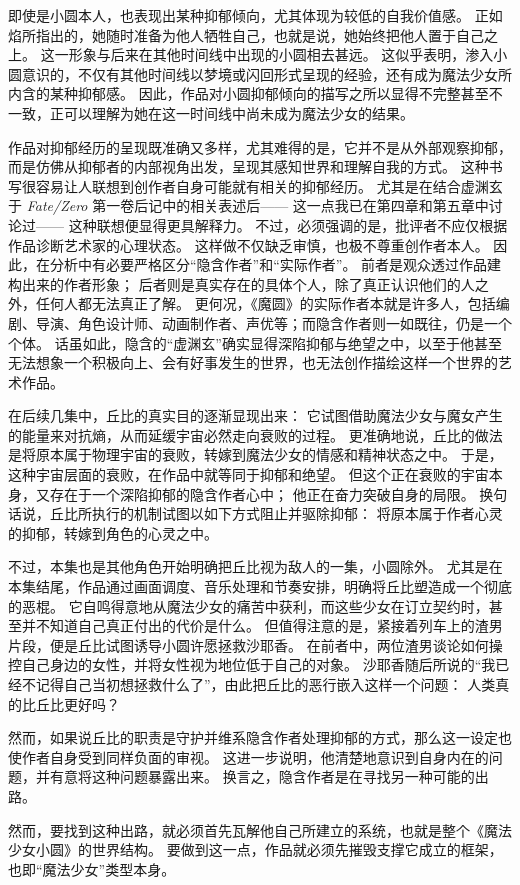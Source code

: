 即使是小圆本人，也表现出某种抑郁倾向，尤其体现为较低的自我价值感。
正如焰所指出的，她随时准备为他人牺牲自己，也就是说，她始终把他人置于自己之上。
这一形象与后来在其他时间线中出现的小圆相去甚远。
这似乎表明，渗入小圆意识的，不仅有其他时间线以梦境或闪回形式呈现的经验，还有成为魔法少女所内含的某种抑郁感。
因此，作品对小圆抑郁倾向的描写之所以显得不完整甚至不一致，正可以理解为她在这一时间线中尚未成为魔法少女的结果。

作品对抑郁经历的呈现既准确又多样，尤其难得的是，它并不是从外部观察抑郁，而是仿佛从抑郁者的内部视角出发，呈现其感知世界和理解自我的方式。
这种书写很容易让人联想到创作者自身可能就有相关的抑郁经历。
尤其是在结合虚渊玄于 \emph{Fate/Zero} 第一卷后记中的相关表述后——
这一点我已在第四章和第五章中讨论过——
这种联想便显得更具解释力。
不过，必须强调的是，批评者不应仅根据作品诊断艺术家的心理状态。
这样做不仅缺乏审慎，也极不尊重创作者本人。
因此，在分析中有必要严格区分“隐含作者”和“实际作者”。
前者是观众透过作品建构出来的作者形象；
后者则是真实存在的具体个人，除了真正认识他们的人之外，任何人都无法真正了解。
更何况，《魔圆》的实际作者本就是许多人，包括编剧、导演、角色设计师、动画制作者、声优等；而隐含作者则一如既往，仍是一个个体。
话虽如此，隐含的“虚渊玄”确实显得深陷抑郁与绝望之中，以至于他甚至无法想象一个积极向上、会有好事发生的世界，也无法创作描绘这样一个世界的艺术作品。

在后续几集中，丘比的真实目的逐渐显现出来：
它试图借助魔法少女与魔女产生的能量来对抗熵，从而延缓宇宙必然走向衰败的过程。
更准确地说，丘比的做法是将原本属于物理宇宙的衰败，转嫁到魔法少女的情感和精神状态之中。
于是，这种宇宙层面的衰败，在作品中就等同于抑郁和绝望。
但这个正在衰败的宇宙本身，又存在于一个深陷抑郁的隐含作者心中；
他正在奋力突破自身的局限。
换句话说，丘比所执行的机制试图以如下方式阻止并驱除抑郁：
将原本属于作者心灵的抑郁，转嫁到角色的心灵之中。

不过，本集也是其他角色开始明确把丘比视为敌人的一集，小圆除外。
尤其是在本集结尾，作品通过画面调度、音乐处理和节奏安排，明确将丘比塑造成一个彻底的恶棍。
它自鸣得意地从魔法少女的痛苦中获利，而这些少女在订立契约时，甚至并不知道自己真正付出的代价是什么。
但值得注意的是，紧接着列车上的渣男片段，便是丘比试图诱导小圆许愿拯救沙耶香。
在前者中，两位渣男谈论如何操控自己身边的女性，并将女性视为地位低于自己的对象。
沙耶香随后所说的“我已经不记得自己当初想拯救什么了”，由此把丘比的恶行嵌入这样一个问题：
人类真的比丘比更好吗？

然而，如果说丘比的职责是守护并维系隐含作者处理抑郁的方式，那么这一设定也使作者自身受到同样负面的审视。
这进一步说明，他清楚地意识到自身内在的问题，并有意将这种问题暴露出来。
换言之，隐含作者是在寻找另一种可能的出路。

然而，要找到这种出路，就必须首先瓦解他自己所建立的系统，也就是整个《魔法少女小圆》的世界结构。
要做到这一点，作品就必须先摧毁支撑它成立的框架，也即“魔法少女”类型本身。
